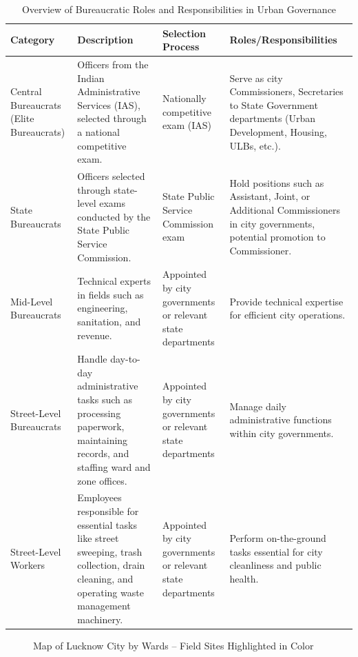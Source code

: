 \begin{table}[ht]
\centering
\caption{Overview of Bureaucratic Roles and Responsibilities in Urban Governance}
\label{tab:bureaucratic_roles}
\begin{tabular}{|p{3cm}|p{5cm}|p{3cm}|p{5cm}|}
\hline
\textbf{Category} & \textbf{Description} & \textbf{Selection Process} & \textbf{Roles/Responsibilities} \\
\hline
Central Bureaucrats (Elite Bureaucrats) & Officers from the Indian Administrative Services (IAS), selected through a national competitive exam. & Nationally competitive exam (IAS) & Serve as city Commissioners, Secretaries to State Government departments (Urban Development, Housing, ULBs, etc.). \\
\hline
State Bureaucrats & Officers selected through state-level exams conducted by the State Public Service Commission. & State Public Service Commission exam & Hold positions such as Assistant, Joint, or Additional Commissioners in city governments, potential promotion to Commissioner. \\
\hline
Mid-Level Bureaucrats & Technical experts in fields such as engineering, sanitation, and revenue. & Appointed by city governments or relevant state departments & Provide technical expertise for efficient city operations. \\
\hline
Street-Level Bureaucrats & Handle day-to-day administrative tasks such as processing paperwork, maintaining records, and staffing ward and zone offices. & Appointed by city governments or relevant state departments & Manage daily administrative functions within city governments. \\
\hline
Street-Level Workers & Employees responsible for essential tasks like street sweeping, trash collection, drain cleaning, and operating waste management machinery. & Appointed by city governments or relevant state departments & Perform on-the-ground tasks essential for city cleanliness and public health. \\
\hline
\end{tabular}
\end{table}

\begin{figure}[ht]
\centering
\caption{Map of Lucknow City by Wards – Field Sites Highlighted in Color}
\label{fig:lucknow_map}
\end{figure}

